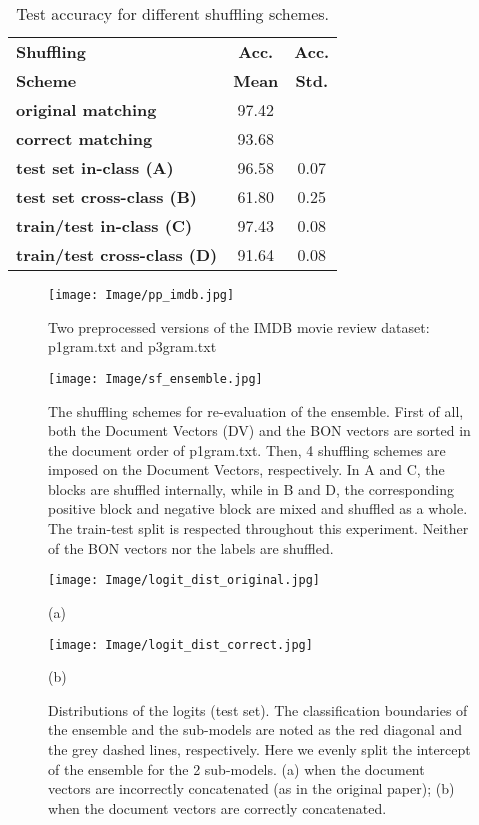 \documentclass[11pt]{article}
\begin{document}
\begin{table}
\centering
\begin{tabular}{lcc}
\hline
\textbf{Shuffling} & \textbf{Acc.} & \textbf{Acc.}\\
\textbf{Scheme} & \textbf{Mean} & \textbf{Std.}\\
\hline
\textbf{original matching} & 97.42 &  \\
\textbf{correct matching} & 93.68 &  \\
\textbf{test set in-class (A)} & 96.58 & 0.07 \\
\textbf{test set cross-class (B)} & 61.80 & 0.25 \\
\textbf{train/test in-class (C)} & 97.43 & 0.08 \\
\textbf{train/test cross-class (D)} & 91.64 & 0.08 \\
\hline
\end{tabular}
\caption{Test accuracy for different shuffling schemes.}
\label{tab:re}
\end{table}

\begin{figure*}[t] \centering \texttt{[image: Image/pp\_imdb.jpg]} 
    \caption{Two preprocessed versions of the IMDB movie review dataset: p1gram.txt and p3gram.txt}
    \label{fig:ppd}
\end{figure*}

\begin{figure*}[t]
    \centering \texttt{[image: Image/sf\_ensemble.jpg]} 
    \caption{The shuffling schemes for re-evaluation of the ensemble. First of all, both the Document Vectors (DV) and the BON vectors are sorted in the document order of p1gram.txt. Then, 4 shuffling schemes are imposed on the Document Vectors, respectively. In A and C, the blocks are shuffled internally, while in B and D, the corresponding positive block and negative block are mixed and shuffled as a whole. The train-test split is respected throughout this experiment. Neither of the BON vectors nor the labels are shuffled.}
    \label{fig:sf_ens}
\end{figure*}

\begin{figure}[t]
    \centering \texttt{[image: Image/logit\_dist\_original.jpg]}
    
    (a)
    
    \texttt{[image: Image/logit\_dist\_correct.jpg]}
    
    (b)
    
    \caption{Distributions of the logits (test set). The classification boundaries of the ensemble and the sub-models are noted as the red diagonal and the grey dashed lines, respectively. Here we evenly split the intercept of the ensemble for the 2 sub-models. (a) when the document vectors are incorrectly concatenated (as in the original paper); (b) when the document vectors are correctly concatenated.}
    \label{fig:logit_dist}
\end{figure}
\end{document}
